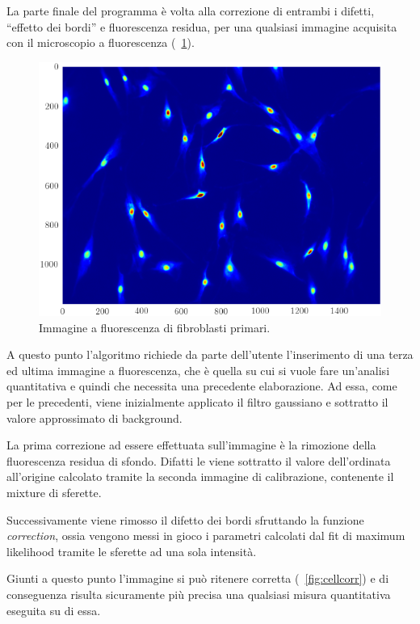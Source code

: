 La parte finale del programma è volta alla correzione di entrambi i difetti, ``effetto dei bordi'' e fluorescenza residua, per una qualsiasi immagine acquisita con il microscopio a fluorescenza (\figurename~\ref{fig:cell}). 

\begin{figure}[p]
 \centering
 \includegraphics[scale=.64]{img/CAP3cell.png}
 \caption{\small{Immagine a fluorescenza di fibroblasti primari.}}
 \label{fig:cell}
\end{figure}

A questo punto l'algoritmo richiede da parte dell'utente l'inserimento di una terza ed ultima immagine a fluorescenza, che è quella su cui si vuole fare un'analisi quantitativa e quindi che necessita una precedente elaborazione.
Ad essa, come per le precedenti, viene inizialmente applicato il filtro gaussiano e sottratto il valore approssimato di background.

La prima correzione ad essere effettuata sull'immagine è la rimozione della fluorescenza residua di sfondo. 
Difatti le viene sottratto il valore dell'ordinata all'origine calcolato tramite la seconda immagine di calibrazione, contenente il mixture di sferette.

Successivamente viene rimosso il difetto dei bordi sfruttando la funzione \textit{correction}, ossia vengono messi in gioco i parametri calcolati dal fit di maximum likelihood tramite le sferette ad una sola intensità.

Giunti a questo punto l'immagine si può ritenere corretta (\figurename~\ref{fig:cellcorr}) e di conseguenza risulta sicuramente più precisa una qualsiasi misura quantitativa eseguita su di essa.

